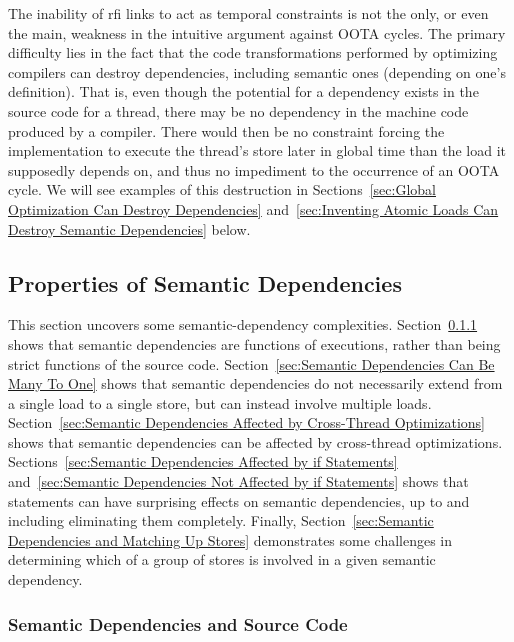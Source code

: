 \documentclass[10]{article}
\begin{document}
The inability of rfi links to act as temporal constraints is not the
only, or even the main, weakness in the intuitive argument against
OOTA cycles.
The primary difficulty lies in the fact that the code transformations
performed by optimizing compilers can destroy dependencies, including
semantic ones (depending on one's definition).
That is, even though the potential for a dependency exists in the
source code for a thread, there may be no dependency in the machine
code produced by a compiler.
There would then be no constraint forcing the implementation to execute
the thread's store later in global time than the load it supposedly depends on,
and thus no impediment to the occurrence of an OOTA cycle.
We will see examples of this destruction in
Sections~\ref{sec:Global Optimization Can Destroy Dependencies}
and~\ref{sec:Inventing Atomic Loads Can Destroy Semantic Dependencies} below.

\subsection{Properties of Semantic Dependencies}
\label{sec:Properties of Semantic Dependencies}

This section uncovers some semantic-dependency complexities.
Section~\ref{sec:Semantic Dependencies and Source Code}
shows that semantic dependencies are functions of executions,
rather than being strict functions of the source code.
Section~\ref{sec:Semantic Dependencies Can Be Many To One}
shows that semantic dependencies do not necessarily extend
from a single load to a single store, but can instead involve
multiple loads.
Section~\ref{sec:Semantic Dependencies Affected by Cross-Thread Optimizations}
shows that semantic dependencies can be affected by cross-thread
optimizations.
Sections~\ref{sec:Semantic Dependencies Affected by if Statements}
and~\ref{sec:Semantic Dependencies Not Affected by if Statements}
shows that  statements can have surprising effects on semantic
dependencies, up to and including eliminating them completely.
Finally,
Section~\ref{sec:Semantic Dependencies and Matching Up Stores}
demonstrates some challenges in determining which of a group of
stores is involved in a given semantic dependency.

\subsubsection{Semantic Dependencies and Source Code}
\label{sec:Semantic Dependencies and Source Code}
\end{document}
